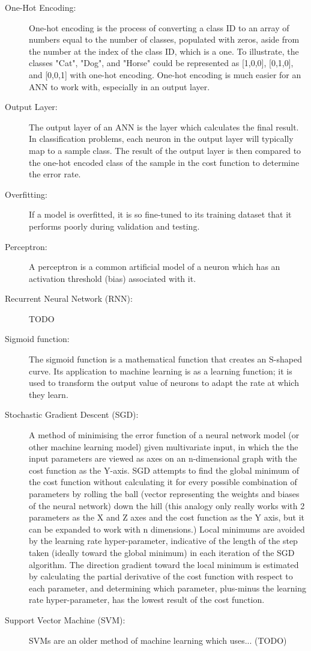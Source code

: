 \documentclass[]{report}
\begin{document}
\begin{description}
	\item[One-Hot Encoding:] One-hot encoding is the process of converting a class ID to an array of numbers equal to the number of classes, populated with zeros, aside from the number at the index of the class ID, which is a one. To illustrate, the classes "Cat", "Dog", and "Horse" could be represented as [1,0,0], [0,1,0], and [0,0,1] with one-hot encoding. One-hot encoding is much easier for an ANN to work with, especially in an output layer.
	
	\item[Output Layer:] The output layer of an ANN is the layer which calculates the final result. In classification problems, each neuron in the output layer will typically map to a sample class. The result of the output layer is then compared to the one-hot encoded class of the sample in the cost function to determine the error rate.
	
	\item[Overfitting:] If a model is overfitted, it is so fine-tuned to its training dataset that it performs poorly during validation and testing.
	
	\item[Perceptron:] A perceptron is a common artificial model of a neuron which has an activation threshold (bias) associated with it.
	
	\item[Recurrent Neural Network (RNN):] TODO
	
	\item[Sigmoid function:] The sigmoid function is a mathematical function that creates an S-shaped curve. Its application to machine learning is as a learning function; it is used to transform the output value of neurons to adapt the rate at which they learn.
	
	\item[Stochastic Gradient Descent (SGD):] A method of minimising the error function of a neural network model (or other machine learning model) given multivariate input, in which the the input parameters are viewed as axes on an n-dimensional graph with the cost function as the Y-axis. SGD attempts to find the global minimum of the cost function without calculating it for every possible combination of parameters by rolling the ball (vector representing the weights and biases of the neural network) down the hill (this analogy only really works with 2 parameters as the X and Z axes and the cost function as the Y axis, but it can be expanded to work with n dimensions.) Local minimums are avoided by the learning rate hyper-parameter, indicative of the length of the step taken (ideally toward the global minimum) in each iteration of the SGD algorithm. The direction gradient toward the local minimum is estimated by calculating the partial derivative of the cost function with respect to each parameter, and determining which parameter, plus-minus the learning rate hyper-parameter, has the lowest result of the cost function.
	
	\item[Support Vector Machine (SVM):] SVMs are an older method of machine learning which uses... (TODO)
\end{description}
\end{document}
